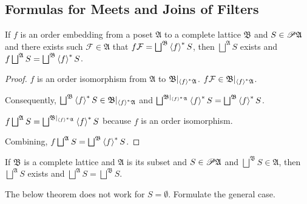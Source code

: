 \subsection{Formulas for Meets and Joins of Filters}
\begin{lem}
\label{embed-lemma}If $f$ is an order embedding from a poset $\mathfrak{A}$
to a complete lattice $\mathfrak{B}$ and $S\in\mathscr{P}\mathfrak{A}$
and there exists such $\mathcal{F}\in\mathfrak{A}$ that $f\mathcal{F}=\bigsqcup^{\mathfrak{B}}\left\langle f\right\rangle ^{\ast}S$,
then $\bigsqcup^{\mathfrak{A}}S$ exists and $f\bigsqcup^{\mathfrak{A}}S=\bigsqcup^{\mathfrak{B}}\left\langle f\right\rangle ^{\ast}S$.\end{lem}
\begin{proof}
$f$ is an order isomorphism from $\mathfrak{A}$ to $\mathfrak{B}|_{\left\langle f\right\rangle ^{\ast}\mathfrak{A}}$.
$f\mathcal{F}\in\mathfrak{B}|_{\left\langle f\right\rangle ^{\ast}\mathfrak{A}}$.

Consequently, $\bigsqcup^{\mathfrak{B}}\left\langle f\right\rangle ^{\ast}S\in\mathfrak{B}|_{\left\langle f\right\rangle ^{\ast}\mathfrak{A}}$
and $\bigsqcup^{\mathfrak{B}|_{\left\langle f\right\rangle ^{\ast}\mathfrak{A}}}\left\langle f\right\rangle ^{\ast}S=\bigsqcup^{\mathfrak{B}}\left\langle f\right\rangle ^{\ast}S$.

$f\bigsqcup^{\mathfrak{A}}S=\bigsqcup^{\mathfrak{B}|_{\left\langle f\right\rangle ^{\ast}\mathfrak{A}}}\left\langle f\right\rangle ^{\ast}S$
because $f$ is an order isomorphism.

Combining, $f\bigsqcup^{\mathfrak{A}}S=\bigsqcup^{\mathfrak{B}}\left\langle f\right\rangle ^{\ast}S$.\end{proof}
\begin{cor}
If $\mathfrak{B}$ is a complete lattice and $\mathfrak{A}$ is its
subset and $S\in\mathscr{P}\mathfrak{A}$ and $\bigsqcup^{\mathfrak{B}}S\in\mathfrak{A}$,
then $\bigsqcup^{\mathfrak{A}}S$
exists and $\bigsqcup^{\mathfrak{A}}S=\bigsqcup^{\mathfrak{B}}S$.\end{cor}

\begin{xca}
The below theorem does not work for $S=\emptyset$. Formulate the general case.
\end{xca}


